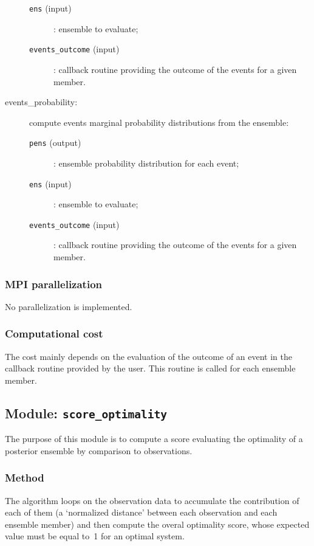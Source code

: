 \documentclass[11pt]{article}
\begin{document}
\begin{description}
\begin{description}
  \item[{\tt ens} (input)]: ensemble to evaluate;
  \item[{\tt events\_outcome} (input)]: callback routine providing the outcome
                                        of the events for a given member.
  \end{description}
\item[events\_probability:] compute events marginal probability distributions from the ensemble:
  \begin{description}
  \item[{\tt pens} (output)]: ensemble probability distribution for each event;
  \item[{\tt ens} (input)]: ensemble to evaluate;
  \item[{\tt events\_outcome} (input)]: callback routine providing the outcome
                                        of the events for a given member.
  \end{description}
\end{description}

\subsubsection*{MPI parallelization}

No parallelization is implemented.

\subsubsection*{Computational cost}

The cost mainly depends on the evaluation of the outcome of an event
in the callback routine provided by the user.
This routine is called for each ensemble member.

\subsection{Module: {\tt\bf score\_optimality}}

The purpose of this module is to compute a score
evaluating the optimality of a posterior ensemble
by comparison to observations.

\subsubsection*{Method}

The algorithm loops on the observation data
to accumulate the contribution of each of them
(a `normalized distance' between each observation and each ensemble member)
and then compute the overal optimality score,
whose expected value must be equal to~1 for an optimal system.
\end{document}
